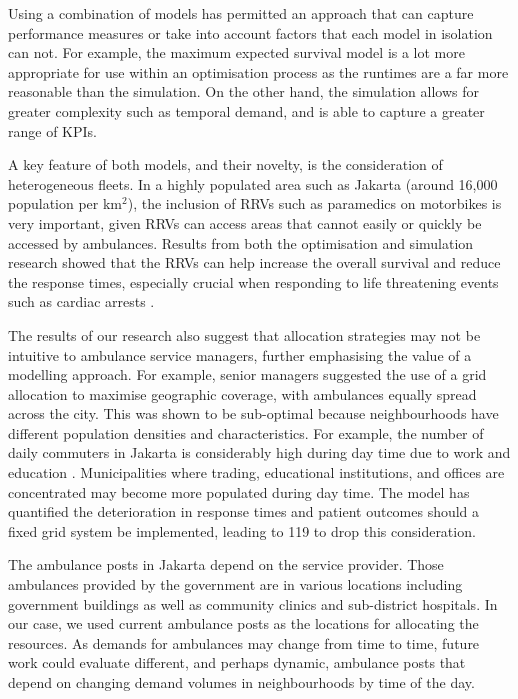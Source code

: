 \documentclass[preprint,12pt]{elsarticle}
\begin{document}
Using a combination of models has permitted an approach that can capture
performance measures or take into account factors that each model in isolation
can not. For example, the maximum expected survival model is a lot more
appropriate for use within an optimisation process as the runtimes are a far
more reasonable than the simulation. On the other hand, the simulation allows
for greater complexity such as temporal demand, and is able to capture a
greater range of KPIs.

A key feature of both models, and their novelty, is the consideration of
heterogeneous fleets. In a highly populated area such as Jakarta (around
16,000 population per km$^2$), the inclusion of RRVs such as paramedics on
motorbikes is very important, given RRVs can access areas that cannot easily
or quickly be accessed by ambulances. Results from both the optimisation and
simulation research showed that the RRVs can help increase the overall
survival and reduce the response times, especially crucial when responding to
life threatening events such as cardiac arrests \cite{holmen2020shortening}. 

The results of our research also suggest that allocation strategies may not be
intuitive to ambulance service managers, further emphasising the value of a
modelling approach. For example, senior managers suggested the use of a grid
allocation to maximise geographic coverage, with ambulances equally spread
across the city. This was shown to be sub-optimal because neighbourhoods have
different population densities and characteristics. For example, the number of
daily commuters in Jakarta is considerably high during day time due to work
and education \cite{BPS_Jakarta_migrasi}. Municipalities where trading,
educational institutions, and offices are concentrated may become more
populated during day time. The model has quantified the deterioration in
response times and patient outcomes should a fixed grid system be implemented,
leading to 119 to drop this consideration.

The ambulance posts in Jakarta depend on the service provider. Those
ambulances provided by the government are in various locations including
government buildings as well as community clinics and sub-district hospitals.
In our case, we used current ambulance posts as the locations for allocating
the resources. As demands for ambulances may change from time to time, future
work could evaluate different, and perhaps dynamic, ambulance posts that
depend on changing demand volumes in neighbourhoods by time of the day.
\end{document}
